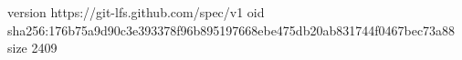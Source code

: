 version https://git-lfs.github.com/spec/v1
oid sha256:176b75a9d90c3e393378f96b895197668ebe475db20ab831744f0467bec73a88
size 2409
